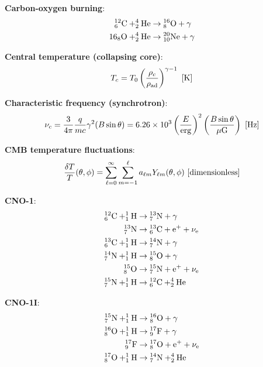 \documentclass[a4paper,10pt]{article}
\begin{document}
{\noindent}\textbf{Carbon-oxygen burning}:
\begin{align*}
    {\rm ^{12}_6C + ^4_2He} &\rightarrow {\rm ^{16}_8O + \gamma} \\
    {\rm {16}_8O + ^4_2He} &\rightarrow {\rm ^{20}_{10}Ne + \gamma}
\end{align*}

{\noindent}\textbf{Central temperature (collapsing core)}:
\begin{align*}
    T_c = T_0 \left(\frac{\rho_c}{\rho_{\rm ad}}\right) ^{\gamma-1} ~ [{\rm K}]
\end{align*}

{\noindent}\textbf{Characteristic frequency (synchrotron)}:
\begin{align*}
    \nu_c = \frac{3}{4\pi}\frac{q}{mc}\gamma^2(B\sin\theta) = 6.26\times10^3 \left(\frac{E}{{\rm erg}}\right)^2 \left(\frac{B\sin\theta}{\mu{\rm G}}\right) ~ [{\rm Hz}]
\end{align*}

{\noindent}\textbf{CMB temperature fluctuations}:
\begin{align*}
    \frac{\delta T}{T}(\theta,\phi) = \sum\limits_{\ell=0}^{\infty}\sum\limits_{m=-1}^{\ell} a_{\ell m}Y_{\ell m}(\theta,\phi) ~ [{\rm dimensionless}]
\end{align*}

{\noindent}\textbf{CNO-1}:
\begin{align*}
    {\rm ^{12}_6C + ^1_1H} &\rightarrow {\rm ^{13}_7N + \gamma} \\
    {\rm ^{13}_7N} &\rightarrow {\rm ^{13}_6C + e^+ + \nu_e} \\
    {\rm ^{13}_6C + ^1_1H} &\rightarrow {\rm ^{14}_7N + \gamma} \\
    {\rm ^{14}_7N + ^1_1H} &\rightarrow {\rm ^{15}_8O + \gamma} \\
    {\rm ^{15}_8O} &\rightarrow {\rm ^{15}_7N + e^+ + \nu_e} \\
    {\rm ^{15}_7N + ^1_1H} &\rightarrow {\rm ^{12}_6C + ^4_2He}
\end{align*}

{\noindent}\textbf{CNO-1I}:
\begin{align*}
    {\rm ^{15}_7N + ^1_1H} &\rightarrow {\rm ^{16}_8O + \gamma} \\
    {\rm ^{16}_8O + ^1_1H} &\rightarrow {\rm ^{17}_9F +\gamma} \\
    {\rm ^{17}_9F} &\rightarrow {\rm ^{17}_8O + e^+ + \nu_e} \\
    {\rm ^{17}_8O + ^1_1H} &\rightarrow {\rm ^{14}_7N + ^4_2He}
\end{align*}
\end{document}

